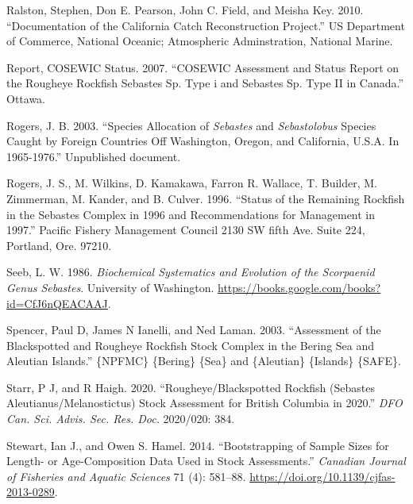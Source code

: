 \documentclass[
]{scrartcl}
\newlength{\cslhangindent}
\newenvironment{CSLReferences}[2] %
 {\begin{list}{}{%
  \setlength{\itemindent}{0pt}
  \setlength{\leftmargin}{0pt}
  \setlength{\parsep}{0pt}
  \ifodd #1
   \setlength{\leftmargin}{\cslhangindent}
   \setlength{\itemindent}{-1\cslhangindent}
  \fi
  \setlength{\itemsep}{#2\baselineskip}}}
 {\end{list}}
\begin{document}
\begin{CSLReferences}{1}{0}
Ralston, Stephen, Don E. Pearson, John C. Field, and Meisha Key. 2010.
{``Documentation of the {California} Catch Reconstruction Project.''} US
Department of Commerce, National Oceanic; Atmospheric Adminstration,
National Marine.

Report, COSEWIC Status. 2007. {``COSEWIC Assessment and Status Report on
the Rougheye Rockfish Sebastes Sp. Type i and Sebastes Sp. Type II in
Canada.''} Ottawa.

Rogers, J. B. 2003. {``Species Allocation of \emph{Sebastes} and
\emph{Sebastolobus} Species Caught by Foreign Countries Off
{Washington}, {Oregon}, and {California}, {U}.{S}.{A}. In 1965-1976.''}
Unpublished document.

Rogers, J. S., M. Wilkins, D. Kamakawa, Farron R. Wallace, T. Builder,
M. Zimmerman, M. Kander, and B. Culver. 1996. {``Status of the
{Remaining} {Rockfish} in the {Sebastes} {Complex} in 1996 and
Recommendations for Management in 1997.''} Pacific Fishery Management
Council 2130 SW fifth Ave. Suite 224, Portland, Ore. 97210.

Seeb, L. W. 1986. \emph{Biochemical {Systematics} and {Evolution} of the
{Scorpaenid} {Genus} {Sebastes}}. University of Washington.
\url{https://books.google.com/books?id=CfJ6nQEACAAJ}.

Spencer, Paul D, James N Ianelli, and Ned Laman. 2003. {``Assessment of
the {Blackspotted} and {Rougheye} {Rockfish} {Stock} {Complex} in the
{Bering} {Sea} and {Aleutian} {Islands}.''} \{NPFMC\} \{Bering\} \{Sea\}
and \{Aleutian\} \{Islands\} \{SAFE\}.

Starr, P J, and R Haigh. 2020. {``Rougheye/{Blackspotted} {Rockfish}
({Sebastes} Aleutianus/Melanostictus) Stock Assessment for {British}
{Columbia} in 2020.''} \emph{DFO Can. Sci. Advis. Sec. Res. Doc.}
2020/020: 384.

Stewart, Ian J., and Owen S. Hamel. 2014. {``Bootstrapping of Sample
Sizes for Length- or Age-Composition Data Used in Stock Assessments.''}
\emph{Canadian Journal of Fisheries and Aquatic Sciences} 71 (4):
581--88. \url{https://doi.org/10.1139/cjfas-2013-0289}.


\end{CSLReferences}
\end{document}
